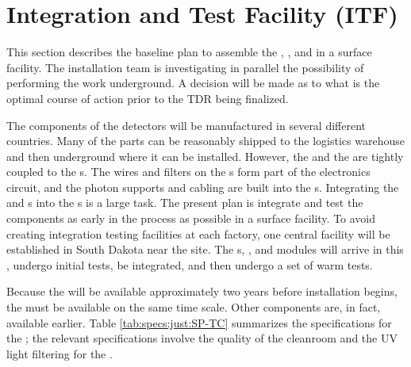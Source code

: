 \section{Integration and Test Facility (ITF)}
\label{sec:fdsp-tc-itf}

This section describes the baseline plan to assemble the , , and  in a surface facility. The installation team is investigating in parallel the possibility of performing the work underground. A decision will be made as to what is the optimal course of action prior to the TDR being finalized.

The components of the  detectors will be manufactured in several different countries. 
Many of the parts can be reasonably shipped to the logistics warehouse and then underground where it can be installed. 
However, the   and the  are tightly coupled to the s. 
The wires and filters on the s form part of the electronics circuit, and the photon supports and cabling are built into the s. 
Integrating the  and s into the s is a large task.  The present plan is integrate and test the components as early in the process as possible in a surface facility.  
To avoid creating integration testing facilities at each factory, one central facility will be established in South Dakota near the  site. 
The s, , and  modules will arrive in this , undergo initial tests, be integrated, and then undergo a set of warm tests. 

Because the  will be available approximately two years before installation begins, the  must be available on the same time scale. Other components are, in fact, available earlier. 
Table \ref{tab:specs:just:SP-TC} summarizes the specifications for the ;  
the relevant specifications involve the quality of the cleanroom and the UV light filtering for the .






